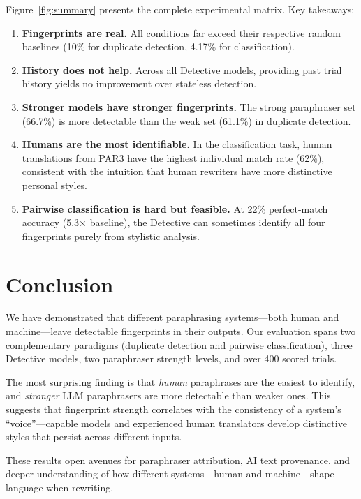 \documentclass[sigconf,nonacm]{acmart}
\begin{document}
Figure~\ref{fig:summary} presents the complete experimental matrix.
Key takeaways:
\begin{enumerate}
    \item \textbf{Fingerprints are real.} All conditions far exceed their respective random baselines (10\% for duplicate detection, 4.17\% for classification).
    \item \textbf{History does not help.} Across all Detective models, providing past trial history yields no improvement over stateless detection.
    \item \textbf{Stronger models have stronger fingerprints.} The strong paraphraser set (66.7\%) is more detectable than the weak set (61.1\%) in duplicate detection.
    \item \textbf{Humans are the most identifiable.} In the classification task, human translations from PAR3 have the highest individual match rate (62\%), consistent with the intuition that human rewriters have more distinctive personal styles.
    \item \textbf{Pairwise classification is hard but feasible.} At 22\% perfect-match accuracy (5.3$\times$ baseline), the Detective can sometimes identify all four fingerprints purely from stylistic analysis.
\end{enumerate}

\section{Conclusion}

We have demonstrated that different paraphrasing systems---both human and machine---leave detectable fingerprints in their outputs.
Our evaluation spans two complementary paradigms (duplicate detection and pairwise classification), three Detective models, two paraphraser strength levels, and over 400 scored trials.

The most surprising finding is that \emph{human} paraphrases are the easiest to identify, and \emph{stronger} LLM paraphrasers are more detectable than weaker ones.
This suggests that fingerprint strength correlates with the consistency of a system's ``voice''---capable models and experienced human translators develop distinctive styles that persist across different inputs.

These results open avenues for paraphraser attribution, AI text provenance, and deeper understanding of how different systems---human and machine---shape language when rewriting.
\end{document}
